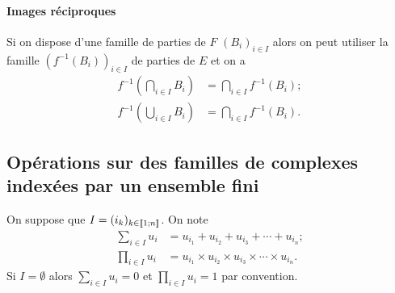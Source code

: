 \paragraph{Images réciproques}
\label{chap3-par:imagerec}
Si on dispose d'une famille de parties de $F$ $(B_i)_{i \in I}$ alors on peut utiliser la famille $(f^{-1}(B_i))_{i \in I}$ de parties de $E$ et on a 
\begin{align}
  f^{-1} \left(\bigcap\limits_{i \in I} B_i\right) &= \bigcap\limits_{i \in I} f^{-1}(B_i);\\
  f^{-1} \left(\bigcup\limits_{i \in I} B_i\right) &= \bigcap\limits_{i \in I} f^{-1}(B_i).
\end{align}
\subsection{Opérations sur des familles de complexes indexées par un ensemble fini}
\label{chap3-subsec:operationsfamilles}
On suppose que $I=(i_k)_{k \in  \mathopen{\llbracket}1\mathclose{}\mathpunct{};n\mathclose{\rrbracket}}$. On note 
\begin{align}
  \sum_{i \in I} u_i &= u_{i_1} +u_{i_2} +u_{i_3} + \dotsb +u_{i_n}; \\
  \prod_{i \in I} u_i &= u_{i_1} \times u_{i_2} \times u_{i_3} \times \dotsm \times u_{i_n}. 
\end{align}
Si $I=\emptyset$ alors $\sum_{i \in I} u_i=0$ et $\prod_{i \in I} u_i=1$ par convention.
